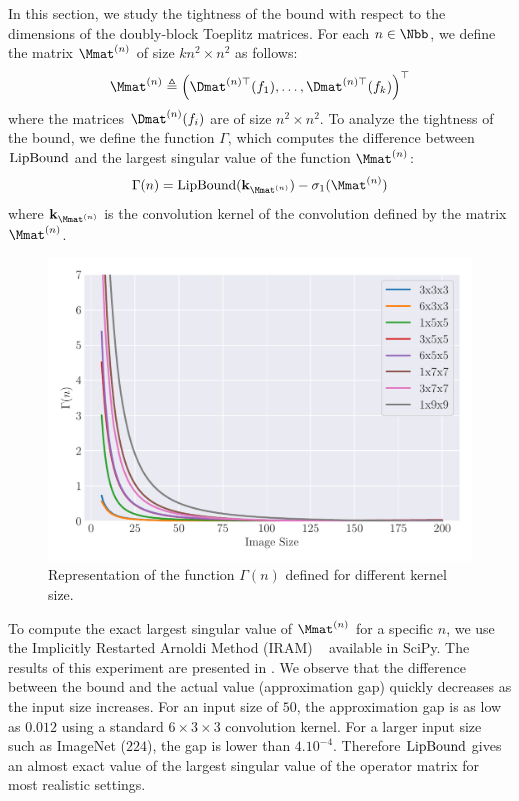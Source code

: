 In this section, we study the tightness of the bound with respect to the dimensions of the doubly-block Toeplitz matrices.
For each $n \in \Nbb$, we define the matrix  $\Mmat^{(n)}$ of size $kn^2 \times n^2$ as follows:
\begin{equation}
  \Mmat^{(n)} \triangleq \textstyle \leftmat \Dmat^{(n)\top}(f_1), \dots, \Dmat^{(n)\top}(f_k) \textstyle \rightmat^\top
\end{equation}
where the matrices $\Dmat^{(n)}(f_i)$ are of size $n^2 \times n^2$. 
To analyze the tightness of the bound, we define the function $\Gamma$, which computes the difference between $\mathrm{LipBound}$ and the largest singular value of the function $\Mmat^{(n)}$:
\begin{equation} \label{equation:function_convergence}
  \Gamma(n) = \lipbound(\mathbf{k}_{\Mmat^{(n)}}) - \sigma_1(\Mmat^{(n)})
\end{equation}
where $\mathbf{k}_{\Mmat^{(n)}}$ is the  convolution kernel of the convolution defined by the matrix $\Mmat^{(n)}$.

\begin{figure}[ht]
  \centering
  \includegraphics[width=\scalefigure\textwidth]{figures/main/ch5-lipschitz_regularization/convergence_bounds.pdf}
  \caption{Representation of the function $\Gamma(n)$ defined for different kernel size.}
  \label{figure:convergence_bound}
\end{figure}


To compute the exact largest singular value of $\Mmat^{(n)}$ for a specific $n$, we use the Implicitly Restarted Arnoldi Method (IRAM) ~\cite{lehoucq1996deflation} available in SciPy.
The results of this experiment are presented in .
We observe that the difference between the bound and the actual value (approximation gap) quickly decreases as the input size increases.
For an input size of $50$, the approximation gap is as low as $0.012$ using a standard $6\times3\times3$ convolution kernel.
For a larger input size such as ImageNet ($224$), the gap is lower than $4.10^{-4}$.
Therefore $\mathrm{LipBound}$ gives an almost exact value of the largest singular value of the operator matrix for most realistic settings.

